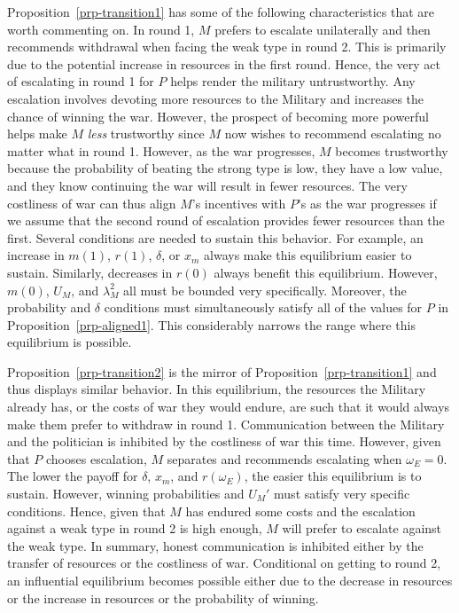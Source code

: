 \documentclass[
  12pt,
]{article}
\theoremstyle{plain}
\theoremstyle{plain}
\theoremstyle{remark}
\begin{document}
Proposition~\ref{prp-transition1} has some of the following
characteristics that are worth commenting on. In round 1, \(M\) prefers
to escalate unilaterally and then recommends withdrawal when facing the
weak type in round 2. This is primarily due to the potential increase in
resources in the first round. Hence, the very act of escalating in round
1 for \(P\) helps render the military untrustworthy. Any escalation
involves devoting more resources to the Military and increases the
chance of winning the war. However, the prospect of becoming more
powerful helps make \(M\) \emph{less} trustworthy since \(M\) now wishes
to recommend escalating no matter what in round 1. However, as the war
progresses, \(M\) becomes trustworthy because the probability of beating
the strong type is low, they have a low value, and they know continuing
the war will result in fewer resources. The very costliness of war can
thus align \(M\)'s incentives with \(P\)'s as the war progresses if we
assume that the second round of escalation provides fewer resources than
the first. Several conditions are needed to sustain this behavior. For
example, an increase in \(m(1)\), \(r(1)\), \(\delta\), or \(x_m\)
always make this equilibrium easier to sustain. Similarly, decreases in
\(r(0)\) always benefit this equilibrium. However, \(m(0)\), \(U_M\),
and \(\lambda^2_M\) all must be bounded very specifically. Moreover, the
probability and \(\delta\) conditions must simultaneously satisfy all of
the values for \(P\) in Proposition~\ref{prp-aligned1}. This
considerably narrows the range where this equilibrium is possible.

Proposition~\ref{prp-transition2} is the mirror of
Proposition~\ref{prp-transition1} and thus displays similar behavior. In
this equilibrium, the resources the Military already has, or the costs
of war they would endure, are such that it would always make them prefer
to withdraw in round 1. Communication between the Military and the
politician is inhibited by the costliness of war this time. However,
given that \(P\) chooses escalation, \(M\) separates and recommends
escalating when \(\omega_E = 0\). The lower the payoff for \(\delta\),
\(x_m\), and \(r(\omega_E)\), the easier this equilibrium is to sustain.
However, winning probabilities and \(U_M'\) must satisfy very specific
conditions. Hence, given that \(M\) has endured some costs and the
escalation against a weak type in round 2 is high enough, \(M\) will
prefer to escalate against the weak type. In summary, honest
communication is inhibited either by the transfer of resources or the
costliness of war. Conditional on getting to round 2, an influential
equilibrium becomes possible either due to the decrease in resources or
the increase in resources or the probability of winning.
\end{document}
